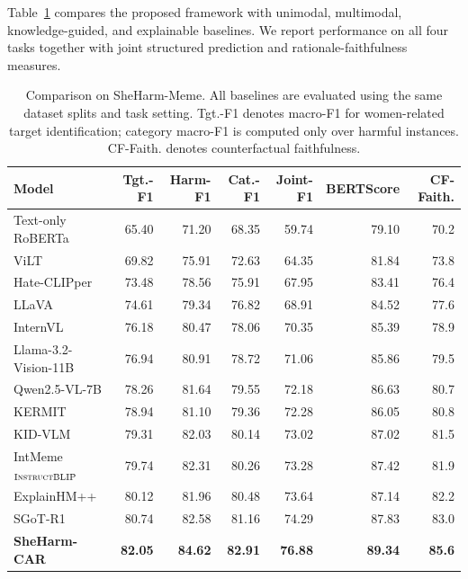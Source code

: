 \documentclass[11pt]{article}
\begin{document}
Table~\ref{tab:main-results} compares the proposed framework with
unimodal, multimodal, knowledge-guided, and explainable baselines.
We report performance on all four tasks together with joint
structured prediction and rationale-faithfulness measures.
\begin{table}[t]
\centering
\small
\setlength{\tabcolsep}{3.2pt}
\renewcommand{\arraystretch}{1.04}
\begin{tabular}{lrrrrrr}
\toprule
\textbf{Model} &
\textbf{Tgt.-F1} &
\textbf{Harm-F1} &
\textbf{Cat.-F1} &
\textbf{Joint-F1} &
\textbf{BERTScore} &
\textbf{CF-Faith.} \\
\midrule

Text-only RoBERTa \citep{liu2019roberta}
& 65.40 & 71.20 & 68.35 & 59.74 & 79.10 & 70.2 \\

ViLT \citep{kim2021vilt}
& 69.82 & 75.91 & 72.63 & 64.35 & 81.84 & 73.8 \\

Hate-CLIPper \citep{kumar2022hate}
& 73.48 & 78.56 & 75.91 & 67.95 & 83.41 & 76.4 \\

LLaVA \citep{liu2023llava}
& 74.61 & 79.34 & 76.82 & 68.91 & 84.52 & 77.6 \\

InternVL \citep{chen2024internvl}
& 76.18 & 80.47 & 78.06 & 70.35 & 85.39 & 78.9 \\

Llama-3.2-Vision-11B
& 76.94 & 80.91 & 78.72 & 71.06 & 85.86 & 79.5 \\

Qwen2.5-VL-7B \citep{qwen2025vl}
& 78.26 & 81.64 & 79.55 & 72.18 & 86.63 & 80.7 \\

KERMIT \citep{grasso2024kermit}
& 78.94 & 81.10 & 79.36 & 72.28 & 86.05 & 80.8 \\

KID-VLM \citep{garg2025just}
& 79.31 & 82.03 & 80.14 & 73.02 & 87.02 & 81.5 \\
IntMeme$_{\textsc{InstructBLIP}}$ \citep{hee2025demystifying}
& 79.74 & 82.31 & 80.26 & 73.28 & 87.42 & 81.9 \\

ExplainHM++ \citep{lin2025explainhm++}
& 80.12 & 81.96 & 80.48 & 73.64 & 87.14 & 82.2 \\

SGoT-R1 \citep{wang2026sgotr1}
& 80.74 & 82.58 & 81.16 & 74.29 & 87.83 & 83.0 \\

\midrule
\textbf{SheHarm-CAR}
& \textbf{82.05}
& \textbf{84.62}
& \textbf{82.91}
& \textbf{76.88}
& \textbf{89.34}
& \textbf{85.6} \\

\bottomrule
\end{tabular}
\caption{Comparison on SheHarm-Meme. All baselines are evaluated
using the same dataset splits and task setting. Tgt.-F1 denotes
macro-F1 for women-related target identification; category macro-F1
is computed only over harmful instances. CF-Faith. denotes
counterfactual faithfulness.}
\label{tab:main-results}
\end{table}
\end{document}
